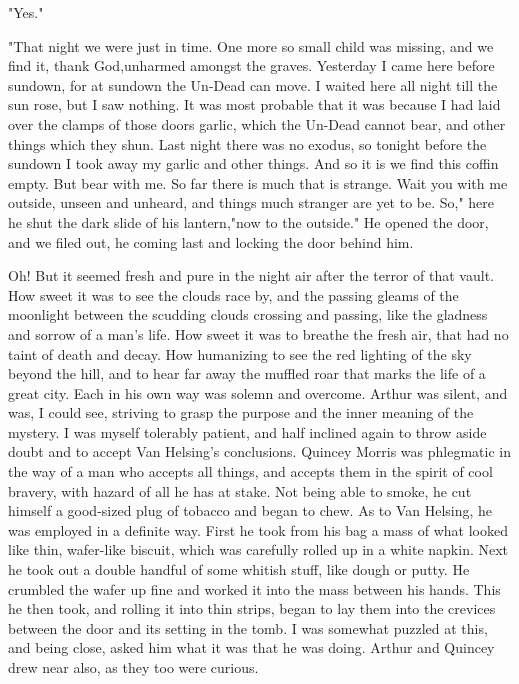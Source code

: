 "Yes." 

"That night we were just in time. One more so small child was missing, and we find it, thank God,unharmed amongst the graves. Yesterday I came here before sundown, for at sundown the Un-Dead can move. I waited here all night till the sun rose, but I saw nothing. It was most probable that it was because I had laid over the clamps of those doors garlic, which the Un-Dead cannot bear, and other things which they shun. Last night there was no exodus, so tonight before the sundown I took away my garlic and other things. And so it is we find this coffin empty. But bear with me. So far there is much that is strange. Wait you with me outside, unseen and unheard, and things much stranger are yet to be. So," here he shut the dark slide of his lantern,"now to the outside." He opened the door, and we filed out, he coming last and locking the door behind him. 

Oh! But it seemed fresh and pure in the night air after the terror of that vault. How sweet it was to see the clouds race by, and the passing gleams of the moonlight between the scudding clouds crossing and passing, like the gladness and sorrow of a man's life. How sweet it was to breathe the fresh air, that had no taint of death and decay. How humanizing to see the red lighting of the sky beyond the hill, and to hear far away the muffled roar that marks the life of a great city. Each in his own way was solemn and overcome. Arthur was silent, and was, I could see, striving to grasp the purpose and the inner meaning of the mystery. I was myself tolerably patient, and half inclined again to throw aside doubt and to accept Van Helsing's conclusions. Quincey Morris was phlegmatic in the way of a man who accepts all things, and accepts them in the spirit of cool bravery, with hazard of all he has at stake. Not being able to smoke, he cut himself a good-sized plug of tobacco and began to chew. As to Van Helsing, he was employed in a definite way. First he took from his bag a mass of what looked like thin, wafer-like biscuit, which was carefully rolled up in a white napkin. Next he took out a double handful of some whitish stuff, like dough or putty. He crumbled the wafer up fine and worked it into the mass between his hands. This he then took, and rolling it into thin strips, began to lay them into the crevices between the door and its setting in the tomb. I was somewhat puzzled at this, and being close, asked him what it was that he was doing. Arthur and Quincey drew near also, as they too were curious. 

